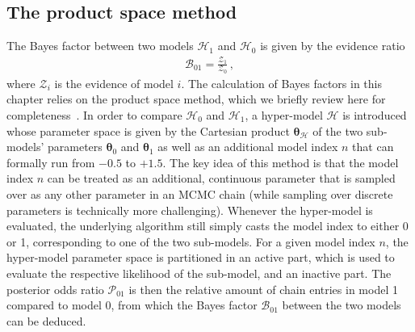 	\subsection{The product space method}
	\label{sec:product_space_method}
	The Bayes factor between two models $\mathcal{H}_1$ and $\mathcal{H}_0$ is given by the evidence ratio
	\begin{align}
		\mathcal{B}_{01} = \frac{\mathcal{Z}_1}{\mathcal{Z}_0} \, ,
	\end{align}
	where $\mathcal{Z}_i$ is the evidence of model $i$. The calculation of Bayes factors in this chapter relies on the product space method, which we briefly review here for completeness~\cite{Hee:2015eba,10.2307/1391010, Chamberlin:2014ria, 10.2307/2346151}. In order to compare $\mathcal{H}_0$ and $\mathcal{H}_1$, a hyper-model $\mathcal{H}$ is introduced whose parameter space is given by the Cartesian product $\bm{\theta}_\mathcal{H}$ of the two sub-models' parameters $\bm{\theta}_0$ and $\bm{\theta}_1$ as well as an additional model index $n$ that can formally run from $-0.5$ to $+1.5$. The key idea of this method is that the model index $n$ can be treated as an additional, continuous parameter  that is sampled over as any other parameter in an \ac{MCMC} chain (while sampling over discrete parameters is technically more challenging). Whenever the hyper-model is evaluated, the underlying algorithm still simply casts the model index to either 0 or 1, corresponding to one of the two sub-models. For a given model index $n$, the hyper-model parameter space is partitioned in an active part, which is used to evaluate the respective likelihood of the sub-model, and an inactive part. The posterior odds ratio $\mathcal{P}_{01}$ is then the relative amount of chain entries in model 1 compared to model 0, from which the Bayes factor $\mathcal{B}_{01}$ between the two models can be deduced.
	
